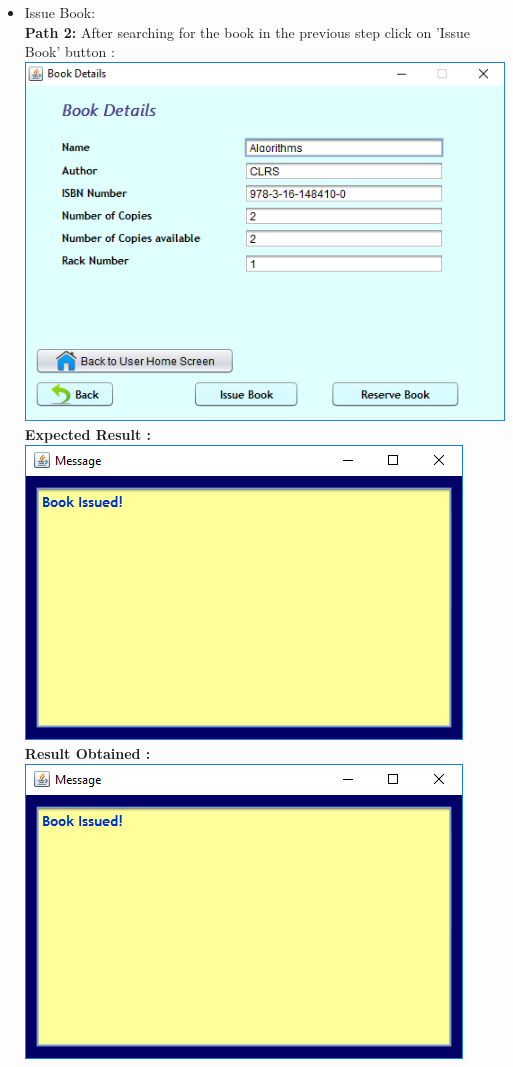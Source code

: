 \documentclass{article}
\begin{document}
\begin{enumerate}
\begin{itemize}
\item Issue Book: \\
\textbf{Path 2:}
After searching for the book in the previous step click on 'Issue Book' button :\\
\includegraphics[scale=0.8]{images/UserLogin/Actions/SearchExisting/SearchByName/Found.PNG}\\
\textbf{Expected Result :}\\
\includegraphics[scale=0.8]{images/UserLogin/Actions/BookIssued.PNG}\\
\textbf{Result Obtained :}\\
\includegraphics[scale=0.8]{images/UserLogin/Actions/BookIssued.PNG}\\


\end{itemize}
\end{enumerate}
\end{document}
